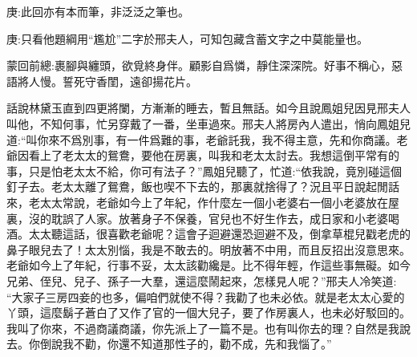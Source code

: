 

\begin{parag}
    \begin{note}庚:此回亦有本而筆，非泛泛之筆也。\end{note}
\end{parag}


\begin{parag}
    \begin{note}庚:只看他題綱用“尷尬”二字於邢夫人，可知包藏含蓄文字之中莫能量也。\end{note}
\end{parag}


\begin{parag}
    \begin{note}蒙回前總:裹腳與纏頭，欲覓終身伴。顧影自爲憐，靜住深深院。好事不稱心，惡語將人慢。誓死守香閨，遠卻揚花片。\end{note}
\end{parag}


\begin{parag}
    話說林黛玉直到四更將闌，方漸漸的睡去，暫且無話。如今且說鳳姐兒因見邢夫人叫他，不知何事，忙另穿戴了一番，坐車過來。邢夫人將房內人遣出，悄向鳳姐兒道:“叫你來不爲別事，有一件爲難的事，老爺託我，我不得主意，先和你商議。老爺因看上了老太太的鴛鴦，要他在房裏，叫我和老太太討去。我想這倒平常有的事，只是怕老太太不給，你可有法子？”鳳姐兒聽了，忙道:“依我說，竟別碰這個釘子去。老太太離了鴛鴦，飯也喫不下去的，那裏就捨得了？況且平日說起閒話來，老太太常說，老爺如今上了年紀，作什麼左一個小老婆右一個小老婆放在屋裏，沒的耽誤了人家。放著身子不保養，官兒也不好生作去，成日家和小老婆喝酒。太太聽這話，很喜歡老爺呢？這會子迴避還恐迴避不及，倒拿草棍兒戳老虎的鼻子眼兒去了！太太別惱，我是不敢去的。明放著不中用，而且反招出沒意思來。老爺如今上了年紀，行事不妥，太太該勸纔是。比不得年輕，作這些事無礙。如今兄弟、侄兒、兒子、孫子一大羣，還這麼鬧起來，怎樣見人呢？”邢夫人冷笑道: “大家子三房四妾的也多，偏咱們就使不得？我勸了也未必依。就是老太太心愛的丫頭，這麼鬍子蒼白了又作了官的一個大兒子，要了作房裏人，也未必好駁回的。我叫了你來，不過商議商議，你先派上了一篇不是。也有叫你去的理？自然是我說去。你倒說我不勸，你還不知道那性子的，勸不成，先和我惱了。”
\end{parag}


